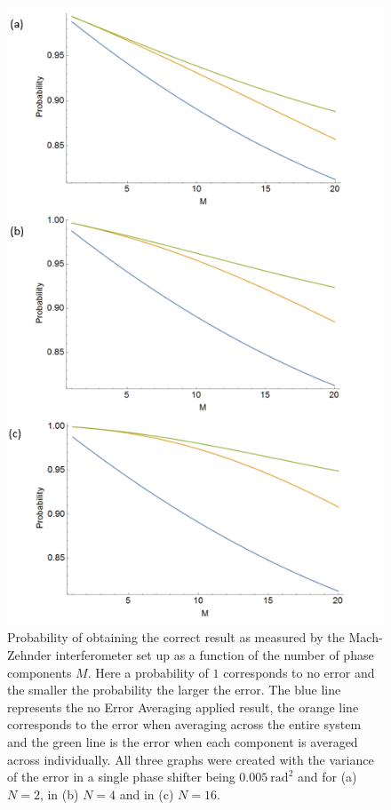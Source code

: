 \documentclass[aps,pra,twocolumn,superscriptaddress,numerical,floatfix]{revtex4-1}
\begin{document}
\begin{figure}
\centerline{\includegraphics[width=\columnwidth]{Error_all.png}}
\caption{Probability of obtaining the correct result as measured by the Mach-Zehnder interferometer set up as a function of the number of phase components $M$. Here a probability of $1$ corresponds to no error and the smaller the probability the larger the error. The blue line represents the no Error Averaging applied result, the orange line corresponds to the error when averaging across the entire system and the green line is the error when each component is averaged across individually. All three graphs were created with the variance of the error in a single phase shifter being $0.005\ \textrm{rad}^{2}$ and for (a) $N=2$, in (b) $N=4$ and in (c) $N=16$. \label{fig:Error-as-measured all}}
\end{figure}
\end{document}
